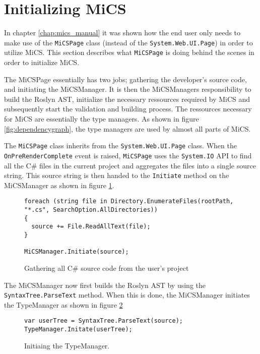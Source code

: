 \section{Initializing MiCS} %
\label{sec:initializing_mics}

In chapter \ref{chap:mics_manual} it was shown how the end user only needs to make use of the \texttt{MiCSPage} class (instead of the \texttt{System.Web.UI.Page}) in order to utilize MiCS. This section describes what \texttt{MiCSPage} is doing behind the scenes in order to initialize MiCS.

The MiCSPage essentially has two jobs; gathering the developer's source code, and initiating the MiCSManager. It is then the MiCSManagers responsibility to build the Roslyn AST, initialize the necessary ressources required by MiCS and subsequently start the validation and building process. The ressources necessary for MiCS are essentially the type managers. As shown in figure \ref{fig:dependencygraph}, the type managers are used by almost all parts of MiCS.

The \texttt{MiCSPage} class inherits from the \texttt{System.Web.UI.Page} class. When the \texttt{OnPreRenderComplete} event is raised, \texttt{MiCSPage} uses the \texttt{System.IO} API to find all the C\# files in the current project and aggregates the files into a single source string. This source string is then handed to the \texttt{Initiate} method on the MiCSManager as shown in figure \ref{fig:init_mics_gather_source_code}.

\begin{figure}[H]
\begin{lstlisting}[language=CSharp,classoffset=1,morekeywords={Directory,SearcOption,File,MiCSManager,ScriptManager}]
foreach (string file in Directory.EnumerateFiles(rootPath, "*.cs", SearchOption.AllDirectories))
{
  source += File.ReadAllText(file);
}

MiCSManager.Initiate(source);
\end{lstlisting}
\caption{Gathering all C\# source code from the user's project}
\label{fig:init_mics_gather_source_code}
\end{figure}

The MiCSManager now first builds the Roslyn AST by using the \texttt{SyntaxTree.ParseText} method. When this is done, the MiCSManager initiates the TypeManager as shown in figure \ref{fig:init_mics_init_typemanager}

\begin{figure}[H]
\begin{lstlisting}[language=CSharp,classoffset=1,morekeywords={TypeManager,SyntaxTree}]
var userTree = SyntaxTree.ParseText(source);
TypeManager.Initate(userTree);
\end{lstlisting}
\caption{Initiaing the TypeManager.}
\label{fig:init_mics_init_typemanager}
\end{figure}

